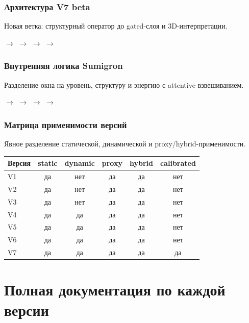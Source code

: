 \documentclass[11pt,a4paper]{article}
\begin{document}
\subsubsection*{Архитектура V7 beta} Новая ветка: структурный оператор до gated-слоя и 3D-интерпретации.
\begin{center} $\rightarrow$  $\rightarrow$  $\rightarrow$  $\rightarrow$ \end{center}
\subsubsection*{Внутренняя логика Sumigron} Разделение окна на уровень, структуру и энергию с attentive-взвешиванием.
\begin{center} $\rightarrow$  $\rightarrow$  $\rightarrow$  $\rightarrow$ \end{center}
\subsubsection*{Матрица применимости версий} Явное разделение статической, динамической и proxy/hybrid-применимости.
\begin{center}\begin{tabular}{lccccc}\toprule Версия & static & dynamic & proxy & hybrid & calibrated \\\midrule V1 & да & нет & да & да & нет \\ V2 & да & нет & да & да & нет \\ V3 & да & нет & да & да & нет \\ V4 & да & да & да & да & нет \\ V5 & да & да & да & да & нет \\ V6 & да & да & да & да & нет \\ V7 & да & да & да & да & да \\\bottomrule\end{tabular}\end{center}

\section{Полная документация по каждой версии}
\end{document}
